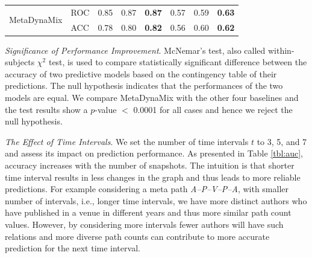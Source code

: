 \begin{table}[t]
\begin{tabular}{ll|p{1cm}|p{1cm}|p{1cm}||p{1cm}|p{1cm}|p{1cm}|}
\multicolumn{1}{|l|}{\multirow{2}{*}{MetaDynaMix}}  & ROC  & 0.85 &  0.87 & \textbf{0.87}   &  0.57  & 0.59 &  \textbf{0.63}  \\ \cline{2-8}
\multicolumn{1}{|l|}{}  & ACC  & 0.78 & 0.80 & \textbf{0.82}   & 0.56  &  0.60  &   \textbf{0.62} \\ \hline

\end{tabular}
\end{table}





\textit{Significance of Performance Improvement}. McNemar's test, also called within-subjects $\chi^2$ test, is used to compare statistically significant difference between the accuracy of two predictive models based on the contingency table of their predictions. The null hypothesis indicates that the performances of the two models are equal. We compare MetaDynaMix with the other four baselines and the test results show a $p$-value $<$ 0.0001 for all cases and hence we reject the null hypothesis.

%    
%    
%
    
    


\textit{The Effect of Time Intervals}. We set the number of time intervals $t$ to 3, 5, and 7 and assess its impact on prediction performance. As presented in Table \ref{tbl:auc}, accuracy increases with the number of snapshots. The intuition is that shorter time interval results in less changes in the graph and thus leads to more reliable predictions. For example considering a meta path \textit{A--P--V--P--A}, with smaller number of intervals, i.e., longer time intervals, we have more distinct authors who have published in a venue in different years and thus more similar path count values. However, by considering more intervals fewer authors will have such relations and more diverse path counts can contribute to more accurate prediction for the next time interval.


